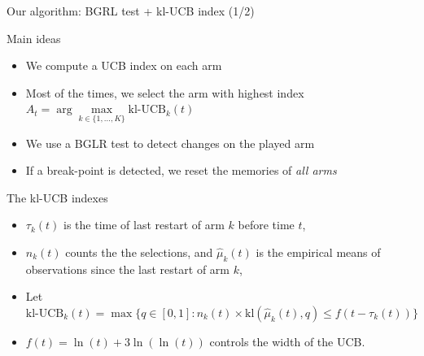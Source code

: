 \documentclass[11pt,english,ignorenonframetext,]{beamer}
\begin{document}
\begin{frame}{Our algorithm: BGRL test + kl-UCB index (1/2)}


  \begin{block}{Main ideas}
    \begin{itemize}
      \item We compute a UCB index on each arm
      \item Most of the times, we select the arm with highest index
      $A_t = \arg\max\limits_{k\in \{1,\dots,K\}} \mbox{kl-UCB}_k(t)$
      \item We use a BGLR test to detect changes on the played arm
      \item If a break-point is detected, we reset the memories of \emph{all arms}
    \end{itemize}
  \end{block}

  \pause

  \begin{exampleblock}{The kl-UCB indexes}
    \begin{itemize}
      \item $\tau_k(t)$ is the time of last restart of arm $k$ before time $t$,
      \item $n_k(t)$ counts the the selections, and $\widehat{\mu}_k(t)$ is the empirical means of observations since the last restart of arm $k$,
      \item Let {\small $\mbox{kl-UCB}_k(t) = \max \bigl\{ q\in[0,1] : n_k(t) \times \mathrm{kl}\left(\widehat{\mu}_k(t),q\right) \leq f(t - \tau_k(t)) \bigr\}$ }
      \item $f(t) = \ln(t) + 3 \ln(\ln(t))$ controls the width of the UCB.
    \end{itemize}
  \end{exampleblock}

\end{frame}
\end{document}
